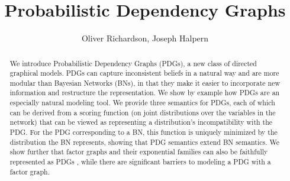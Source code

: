 \documentclass[letterpaper]{article} %
\title{Probabilistic Dependency Graphs}
\author{
	Oliver Richardson, Joseph Halpern \\
}
\theoremstyle{plain}
\theoremstyle{definition}
\theoremstyle{remark}
\newif\ifbody\bodytrue
\begin{document}
\linenumbers
\ifbody
\maketitle
\begin{abstract}
We introduce Probabilistic Dependency Graphs (PDGs), a new class of
directed graphical models.   PDGs can capture inconsistent beliefs in a
natural way and are more modular than Bayesian Networks (BNs), in that
they make it easier to incorporate new information and restructure the  
representation.    We show by example how PDGs are an especially natural
modeling tool.
We provide three semantics for PDGs, each of which can be derived from a
scoring function (on joint distributions over the
variables in the network) that can be viewed as representing a
distribution's incompatibility with the PDG.
For the PDG corresponding
to a BN, this function is uniquely minimized by the distribution the
BN represents, showing that PDG semantics extend BN semantics.  
We show further that factor graphs
and their exponential families
can also be faithfully represented as PDGs%
, while there are significant barriers to modeling a PDG with a factor graph.
\end{abstract}
\end{document}
